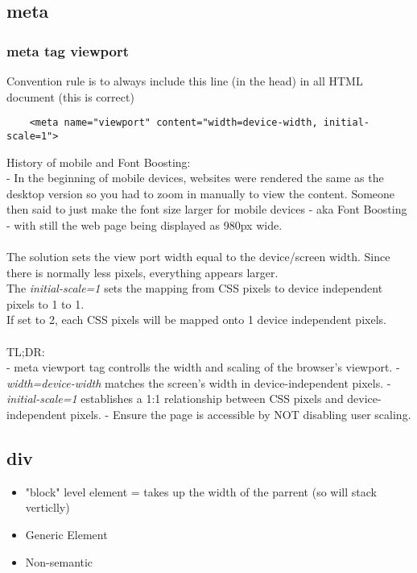 \documentclass[]{article}
\newcommand{\<}{\guilsinglleft}
\renewcommand{\>}{\guilsinglright}
\renewcommand{\it}[1]{\textit{#1}}
\begin{document}
\subsection{meta}

\subsubsection{meta tag viewport}
Convention rule is to always include this line (in the head) in all HTML document (this is correct)
\begin{lstlisting}
    <meta name="viewport" content="width=device-width, initial-scale=1">
\end{lstlisting}
History of mobile and Font Boosting:\\
 - In the beginning of mobile devices, websites were rendered the same as the desktop version so you had to zoom in manually to view the content.  Someone then said to just make the font size larger for mobile devices - aka Font Boosting - with still the web page being displayed as 980px wide.
 \\\\
 The solution sets the view port width equal to the device/screen width.  Since there is normally less pixels, everything appears larger.
 \\ 
 The \it{initial-scale=1} sets the mapping from CSS pixels to device independent pixels to 1 to 1. 
 \\
 If set to 2, each CSS pixels will be mapped onto 1 device independent pixels.
 \\\\
TL;DR:\\
 - meta viewport tag controlls the width and scaling of the browser's viewport.
 - \it{width=device-width} matches the screen's width in device-independent pixels.
 - \it{initial-scale=1} establishes a 1:1 relationship between CSS pixels and device-independent pixels.
 - Ensure the page is accessible by NOT disabling user scaling.

\subsection{div}
\begin{itemize}
	\item "block" level element = takes up the width of the parrent (so will stack verticlly)
	\item Generic Element
	\item Non-semantic
\end{itemize}
\end{document}
